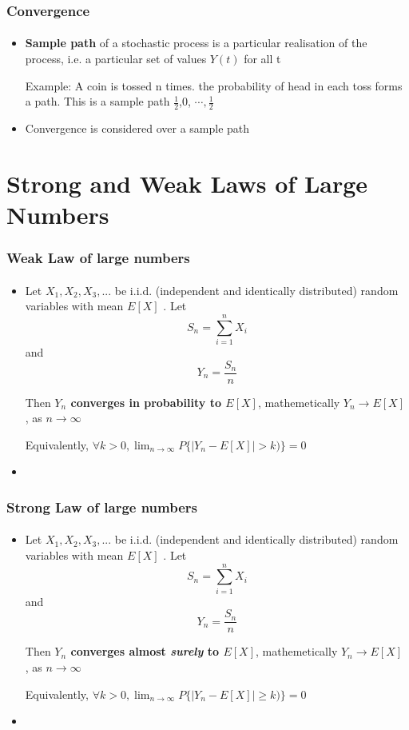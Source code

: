 \documentclass{beamer}
\begin{document}
\begin{frame}
\frametitle{Convergence}
\framesubtitle{\textbf{\textit{}}}
\begin{itemize}
\item \textbf{Sample path} of a stochastic process is a particular realisation of the process, i.e. a particular set of values $Y(t)$ for all t

Example: A coin is tossed n times. the probability of head in each toss forms a path. This is a sample path  $\frac{1}{2}$,$0$, $\cdots{},\frac{1}{2}$

\item Convergence is considered over a sample path
	
\end{itemize}	    
    
\end{frame}

\section{Strong and Weak Laws of Large Numbers}
\begin{frame}
\frametitle{Weak Law of large numbers}
\framesubtitle{\textbf{\textit{}}}
\begin{itemize}
\item Let $X_1 , X_2 , X_3 , . . .$ be i.i.d. (independent and identically distributed) random variables with mean $E [X]$ . Let
$$S_n = {\sum}_{i=1}^{n} X_i$$ and $$Y_n = \frac{S_n}{n}$$

Then \textbf{$Y_n$ converges in probability to $E[X]$}, 
mathemetically $Y_n \rightarrow E[X]$ , as $n \rightarrow \infty$

Equivalently, $\forall k > 0, \lim_{n \rightarrow \infty} P \{  | Y_n - E[X]| > k)\}= 0$


\item
	
\end{itemize}	    
    
\end{frame}

\begin{frame}
\frametitle{Strong Law of large numbers}
\framesubtitle{\textbf{\textit{}}}
\begin{itemize}
\item Let $X_1 , X_2 , X_3 , . . .$ be i.i.d. (independent and identically distributed) random variables with mean $E [X]$ . Let
$$S_n = {\sum}_{i=1}^{n} X_i$$ and $$Y_n = \frac{S_n}{n}$$

Then \textbf{$Y_n$ converges almost \textit{surely} to $E[X]$}, 
mathemetically $Y_n \rightarrow E[X]$ , as $n \rightarrow \infty$

Equivalently, $\forall k > 0, \lim_{n \rightarrow \infty} P \{  | Y_n - E[X]| \geq k)\}= 0$


\item
	
\end{itemize}	    
    
\end{frame}
\end{document}
